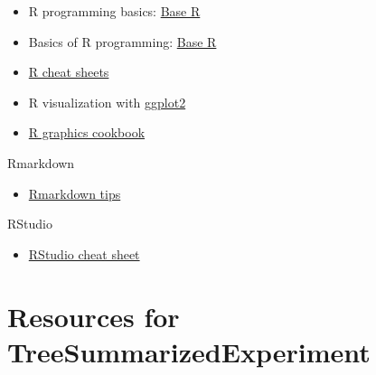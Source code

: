 \documentclass[
]{book}
\providecommand{\tightlist}{%
  \setlength{\itemsep}{0pt}\setlength{\parskip}{0pt}}
\begin{document}
\begin{itemize}
\tightlist
\item
  R programming basics: \href{https://www.rstudio.com/wp-content/uploads/2016/10/r-cheat-sheet-3.pdf}{Base R}
\item
  Basics of R programming: \href{https://raw.githubusercontent.com/rstudio/cheatsheets/master/base-r.pdf}{Base R}
\item
  \href{https://www.rstudio.com/resources/cheatsheets/}{R cheat sheets}
\item
  R visualization with \href{https://www.rstudio.com/wp-content/uploads/2016/11/ggplot2-cheatsheet-2.1.pdf}{ggplot2}
\item
  \href{http://www.cookbook-r.com/Graphs/}{R graphics cookbook}
\end{itemize}

Rmarkdown

\begin{itemize}
\tightlist
\item
  \href{https://rmarkdown.rstudio.com/}{Rmarkdown tips}
\end{itemize}

RStudio

\begin{itemize}
\tightlist
\item
  \href{https://www.rstudio.com/wp-content/uploads/2016/01/rstudio-IDE-cheatsheet.pdf}{RStudio cheat sheet}
\end{itemize}

\hypertarget{resources-for-treesummarizedexperiment}{%
\section{Resources for TreeSummarizedExperiment}\label{resources-for-treesummarizedexperiment}}
\end{document}
